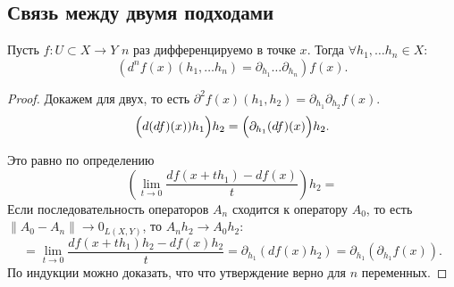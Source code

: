 \subsection{Связь между двумя подходами}
\begin{thm}
    Пусть $ f \colon U \subset X \to  Y$ $ n$ раз дифференцируемо  в точке $ x$. 
    Тогда  $ \forall h_1, \ldots h_n \in X\colon $
    \[
		(d^{n}f(x) (h_1, \ldots h_n) = \partial _{  h_1} \ldots \partial _{h_n})f(x)
    .\] 
\end{thm}
\begin{proof}
	Докажем для двух, то есть $ \partial ^2f(x) (h_1, h_2) = \partial _{h_1} \partial _{h_2} f(x)$.
    \[
    \Bigl(	d(df)(x))h_1\Bigr) h_2 = \Bigl(\partial _{h_1} (df) (x) \Bigr)h_2
    .\] 

    Это равно по определению
    \[
	\left(   \lim_{t \to  0}  \frac{df(x+ th_1) - df(x)}{t}\right) h_2 =
\]
Если последовательность операторов $ A_n$ сходится к оператору  $ A_0$, то есть  $ \| A_0 - A_n \| \to  0_{L(X, Y)} $, то $ A_n h_2 \to A_0 h_2$:
	\[
	 = \lim_{t \to  0} \frac{df(x+th_1)h_2 - df(x)h_2}{t} 
	 = \partial _{h_1}\left( df(x) h_2 \right) 
	 = \partial _{h_1} \left( \partial _{h_1} f(x) \right) 
    .\] 
    По индукции можно доказать, что что утверждение верно для $ n$ переменных.
\end{proof}
